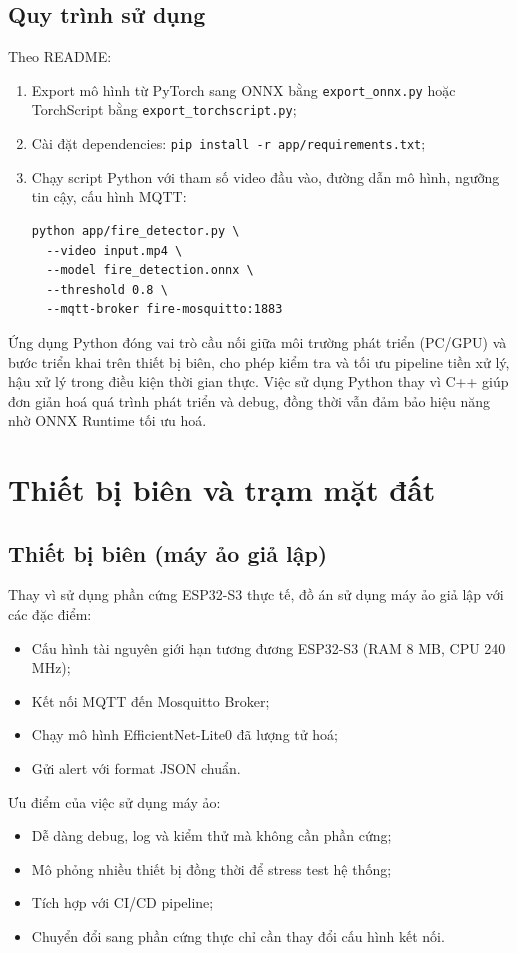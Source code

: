 \documentclass[12pt,a4paper]{report}
\begin{document}
\subsection{Quy trình sử dụng}

Theo README:
\begin{enumerate}
  \item Export mô hình từ PyTorch sang ONNX bằng \texttt{export\_onnx.py} hoặc TorchScript bằng \texttt{export\_torchscript.py};
  \item Cài đặt dependencies: \texttt{pip install -r app/requirements.txt};
  \item Chạy script Python với tham số video đầu vào, đường dẫn mô hình, ngưỡng tin cậy, cấu hình MQTT:
\begin{verbatim}
python app/fire_detector.py \
  --video input.mp4 \
  --model fire_detection.onnx \
  --threshold 0.8 \
  --mqtt-broker fire-mosquitto:1883
\end{verbatim}
\end{enumerate}

Ứng dụng Python đóng vai trò cầu nối giữa môi trường phát triển (PC/GPU) và bước triển khai trên thiết bị biên, cho phép kiểm tra và tối ưu pipeline tiền xử lý, hậu xử lý trong điều kiện thời gian thực. Việc sử dụng Python thay vì C++ giúp đơn giản hoá quá trình phát triển và debug, đồng thời vẫn đảm bảo hiệu năng nhờ ONNX Runtime tối ưu hoá.

\section{Thiết bị biên và trạm mặt đất}

\subsection{Thiết bị biên (máy ảo giả lập)}

Thay vì sử dụng phần cứng ESP32-S3 thực tế, đồ án sử dụng máy ảo giả lập với các đặc điểm:
\begin{itemize}
  \item Cấu hình tài nguyên giới hạn tương đương ESP32-S3 (RAM 8 MB, CPU 240 MHz);
  \item Kết nối MQTT đến Mosquitto Broker;
  \item Chạy mô hình EfficientNet-Lite0 đã lượng tử hoá;
  \item Gửi alert với format JSON chuẩn.
\end{itemize}

Ưu điểm của việc sử dụng máy ảo:
\begin{itemize}
  \item Dễ dàng debug, log và kiểm thử mà không cần phần cứng;
  \item Mô phỏng nhiều thiết bị đồng thời để stress test hệ thống;
  \item Tích hợp với CI/CD pipeline;
  \item Chuyển đổi sang phần cứng thực chỉ cần thay đổi cấu hình kết nối.
\end{itemize}
\end{document}
